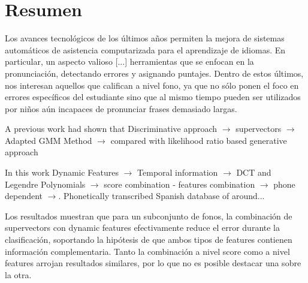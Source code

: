 \chapter*{Resumen}

Los avances tecnológicos de los últimos años permiten la mejora de sistemas
automáticos de asistencia computarizada para el aprendizaje de idiomas. En particular,
un aspecto valioso [...] herramientas que se enfocan en la pronunciación,
detectando errores y asignando puntajes. Dentro de estos últimos, nos interesan
aquellos que califican a nivel fono, ya que
no sólo ponen el foco en errores específicos del estudiante sino que al mismo tiempo
pueden ser utilizados por niños aún incapaces de pronunciar frases
demasiado largas.

A previous work had shown that
Discriminative approach $\rightarrow$
supervectors $\rightarrow$
Adapted GMM Method $\rightarrow$
compared with likelihood ratio based generative approach

In this work
Dynamic Features $\rightarrow$
Temporal information $\rightarrow$
DCT and Legendre Polynomials $\rightarrow$
score combination - features combination $\rightarrow$
phone dependent $\rightarrow$.
Phonetically transcribed Spanish database of around...

Los resultados muestran que para un subconjunto de fonos, la combinación de supervectors
con dynamic features efectivamente reduce el error durante la clasificación, soportando la
hipótesis de que ambos tipos de features contienen información complementaria.
Tanto la combinación a nivel score como a nivel features arrojan resultados similares, por
lo que no es posible destacar una sobre la otra.
